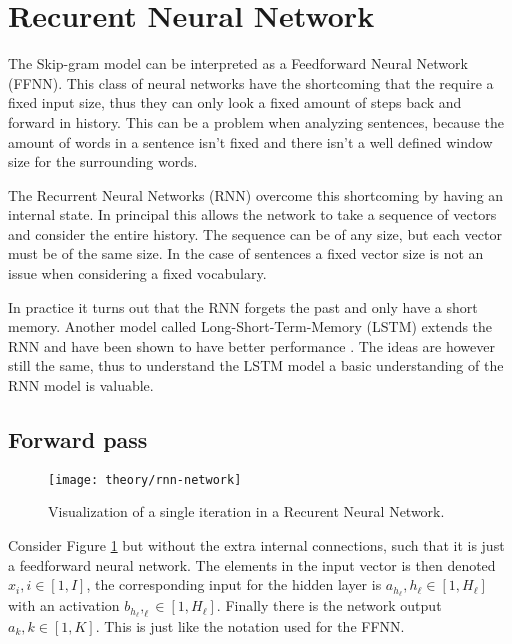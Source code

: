 
\section{Recurent Neural Network}

The Skip-gram model can be interpreted as a Feedforward Neural Network (FFNN). This class of neural networks have the shortcoming that the require a fixed input size, thus they can only look a fixed amount of steps back and forward in history. This can be a problem when analyzing sentences, because the amount of words in a sentence isn't fixed and there isn't a well defined window size for the surrounding words.

The Recurrent Neural Networks (RNN) overcome this shortcoming by having an internal state. In principal this allows the network to take a sequence of vectors and consider the entire history. The sequence can be of any size, but each vector must be of the same size. In the case of sentences a fixed vector size is not an issue when considering a fixed vocabulary.

In practice it turns out that the RNN forgets the past and only have a short memory. Another model called Long-Short-Term-Memory (LSTM) extends the RNN and have been shown to have better performance \cite{alexgraves}. The ideas are however still the same, thus to understand the LSTM model a basic understanding of the RNN model is valuable.

\subsection{Forward pass}

\begin{figure}[h]
	\centering
	\texttt{[image: theory/rnn-network]}
	\caption{Visualization of a single iteration in a Recurent Neural Network.}
	\label{fig:theory:rnn:rnn-network}
\end{figure}

Consider Figure \ref{fig:theory:rnn:rnn-network} but without the extra internal connections, such that it is just a feedforward neural network. The elements in the input vector is then denoted $x_{i}, i \in [1, I]$, the corresponding input for the hidden layer is $a_{h_\ell}, h_\ell \in [1, H_\ell]$ with an activation $b_{h_\ell}, _\ell \in [1, H_\ell]$. Finally there is the network output $a_{k}, k \in [1, K]$. This is just like the notation used for the FFNN.

